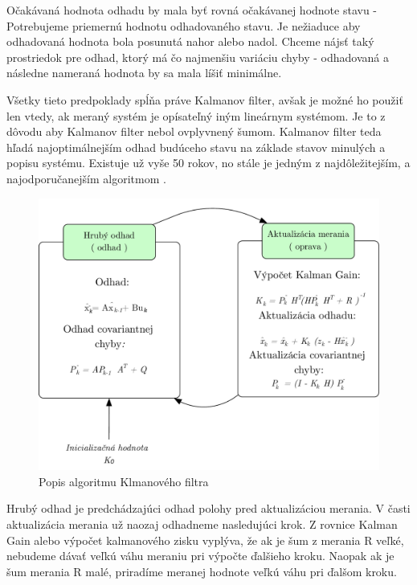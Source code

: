 Očakávaná hodnota odhadu by mala byť rovná očakávanej hodnote stavu - Potrebujeme priemernú hodnotu odhadovaného stavu. Je nežiaduce aby odhadovaná hodnota bola posunutá nahor alebo nadol. 
Chceme nájsť taký prostriedok pre odhad, ktorý má čo najmenšiu variáciu chyby - odhadovaná a následne nameraná hodnota by sa mala líšiť minimálne. 



Všetky tieto predpoklady spĺňa práve Kalmanov filter, avšak je možné ho použiť len vtedy, ak  meraný systém je opísateľný iným lineárnym systémom. Je to z dôvodu aby Kalmanov filter nebol ovplyvnený šumom. Kalmanov filter teda hľadá najoptimálnejším odhad budúceho stavu na základe stavov minulých a popisu systému.  Existuje už vyše 50 rokov, no stále je jedným z najdôležitejším, a najodporučanejším algoritmom \cite{Kalman_web}.

\begin{figure}[H]
\begin{center}
	\includegraphics[scale=0.33]{images/kalman}
	\caption{Popis algoritmu Klmanového filtra}
	\end{center}
\end{figure}

Hrubý odhad je predchádzajúci odhad polohy pred aktualizáciou merania. V časti aktualizácia merania už naozaj odhadneme nasledujúci krok. Z rovnice Kalman Gain alebo výpočet kalmanového zisku vyplýva, že ak je šum z merania R veľké, nebudeme dávať veľkú váhu meraniu pri výpočte ďalšieho kroku. Naopak ak je šum merania R malé, priradíme meranej hodnote veľkú váhu pri ďalšom kroku.  